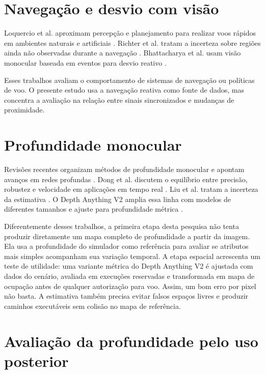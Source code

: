 \section{Navegação e desvio com visão}

Loquercio et al. aproximam percepção e planejamento para realizar voos rápidos em ambientes naturais e artificiais \cite{Loquercio2021}. Richter et al. tratam a incerteza sobre regiões ainda não observadas durante a navegação \cite{BayesianLearning2015}. Bhattacharya et al. usam visão monocular baseada em eventos para desvio reativo \cite{Bhattacharya2024}.

Esses trabalhos avaliam o comportamento de sistemas de navegação ou políticas de voo. O presente estudo usa a navegação reativa como fonte de dados, mas concentra a avaliação na relação entre sinais sincronizados e mudanças de proximidade.

\section{Profundidade monocular}

Revisões recentes organizam métodos de profundidade monocular e apontam avanços em redes profundas \cite{Vyas2022,Arampatzakis2024,Dhanushkodi2025}. Dong et al. discutem o equilíbrio entre precisão, robustez e velocidade em aplicações em tempo real \cite{RealTimeMonocular2022}. Liu et al. tratam a incerteza da estimativa \cite{Liu2023}. O Depth Anything V2 amplia essa linha com modelos de diferentes tamanhos e ajuste para profundidade métrica \cite{DepthAnythingV2}.

Diferentemente desses trabalhos, a primeira etapa desta pesquisa não tenta produzir diretamente um mapa completo de profundidade a partir da imagem. Ela usa a profundidade do simulador como referência para avaliar se atributos mais simples acompanham sua variação temporal. A etapa espacial acrescenta um teste de utilidade: uma variante métrica do Depth Anything V2 é ajustada com dados do cenário, avaliada em execuções reservadas e transformada em mapa de ocupação antes de qualquer autorização para voo. Assim, um bom erro por pixel não basta. A estimativa também precisa evitar falsos espaços livres e produzir caminhos executáveis sem colisão no mapa de referência.

\section{Avaliação da profundidade pelo uso posterior}

